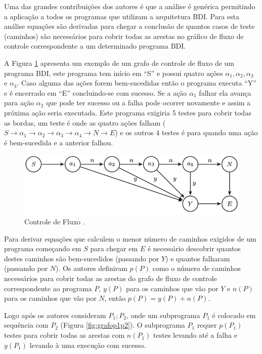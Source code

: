 Uma das grandes contribuições dos autores é que a  análise é genérica permitindo a aplicação a todos os programas que utilizam a arquitetura BDI. Para esta análise equações são derivadas  para chegar a conclusão de quantos casos de teste (caminhos) são necessários para cobrir todas as arestas no gráfico de fluxo de controle correspondente a um determinado programa BDI.

A Figura \ref{fig:control_fluxo} apresenta um exemplo de um grafo de controle de fluxo de um programa BDI, este programa tem início em “S” e possui quatro ações $\alpha_{1}, \alpha_{2}, \alpha_{3}$ e $\alpha_{4}$. Caso alguma das ações forem bem-sucedidas então o programa executa “Y” e é encerrado em “E” concluindo-se com sucesso. Se a ação $\alpha_{1}$ falhar ela avança para ação $\alpha_{2}$ que pode ter sucesso ou a falha pode ocorrer novamente e assim a próxima ação seria executada. Este programa exigiria 5 testes para cobrir todas as bordas, um teste é onde as quatro ações falham ($S \rightarrow \alpha_{1} \rightarrow \alpha_{2} \rightarrow \alpha_{3} \rightarrow \alpha_{4} \rightarrow N \rightarrow E$) e os outros 4 testes é para quando uma ação é bem-sucedida e a anterior falhou.

\begin{figure}[ht]
\centering
\includegraphics[scale=0.5]{imagens/control_flow.png}
\caption{Controle de Fluxo \cite{winikoff2017bdi}.}
\label{fig:control_fluxo}
\end{figure}

Para derivar equações que calculem o menor número de caminhos exigidos de um programa começando em $S$ para chegar em $E$ é necessário descobrir quantos destes caminhos são bem-sucedidos (passando por $Y$) e quantos falharam (passando por $N$). Os autores definiram $p(P)$ como o número de caminhos necessários para cobrir todas as arestas do grafo de fluxo de controle correspondente ao programa $P$, $y(P)$ para os caminhos que vão por $Y$ e $n(P)$ para os caminhos que vão por $N$, então $p(P) = y(P) + n(P)$.

Logo após os autores consideram $P_{1};P_{2}$, onde um subprograma $P_{1}$ é colocado em sequência com $P_{2}$ (Figura \ref{fig:grafop1p2}). O subprograma $P_{1}$ requer $p(P_{1})$ testes para cobrir todas as arestas com $n(P_{1})$ testes levando até a falha e $y(P_{1})$ levando à uma execução com sucesso.

